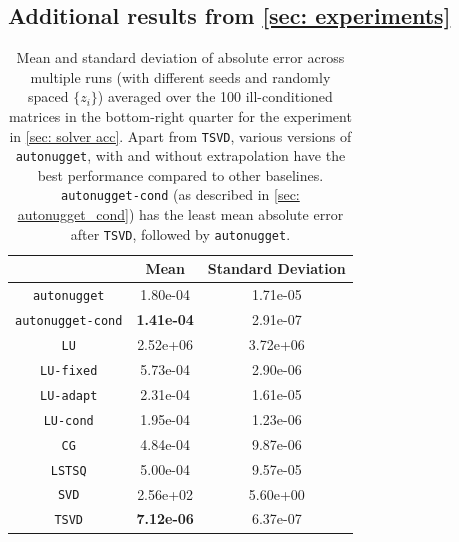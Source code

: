 \documentclass[10pt]{article} %
\begin{document}
\subsection{Additional results from \cref{sec: experiments}}

\begin{table} [t!]
\caption{Mean and standard deviation of absolute error across multiple runs (with different seeds and randomly spaced $\{z_i\}$) averaged over the 100 ill-conditioned matrices in the bottom-right quarter for the experiment in \cref{sec: solver acc}. Apart from  \texttt{TSVD}, various versions of \texttt{autonugget}, with and without extrapolation have the best performance compared to other baselines. \texttt{autonugget-cond} (as described in \cref{sec: autonugget_cond}) has the least mean absolute error after \texttt{TSVD}, followed by \texttt{autonugget}.}
\centering
\begin{tabular}{c|c|c} \label{tab: errors_quarter}
& Mean & Standard Deviation \\
\midrule
\texttt{autonugget} &1.80e-04 & 1.71e-05 \\
\texttt{autonugget-cond} & \textbf{1.41e-04} & 2.91e-07 \\
\texttt{LU} & 2.52e+06 & 3.72e+06 \\
\texttt{LU-fixed} & 5.73e-04 & 2.90e-06 \\
\texttt{LU-adapt} & 2.31e-04 & 1.61e-05 \\
\texttt{LU-cond} & 1.95e-04 & 1.23e-06 \\
\texttt{CG} & 4.84e-04 & 9.87e-06 \\
\texttt{LSTSQ} &5.00e-04 & 9.57e-05 \\
\texttt{SVD} & 2.56e+02 & 5.60e+00\\
\texttt{TSVD} & \textbf{7.12e-06} & 6.37e-07 \\
\end{tabular}
\end{table}
\end{document}

